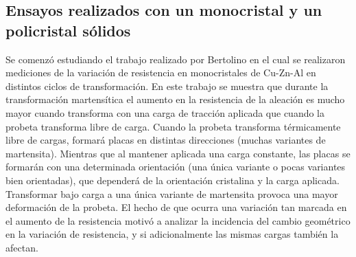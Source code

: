 \documentclass[a4paper,12pt,fleqn,twoside,openany]{book}
\begin{document}

\subsection{Ensayos realizados con un monocristal y un policristal sólidos} \label{PoilicMonocrist}




 
Se comenzó estudiando el trabajo realizado por Bertolino \cite{resistencia} en el cual se realizaron mediciones de la variación de resistencia en monocristales de Cu-Zn-Al en distintos ciclos de transformación. En este trabajo se muestra que durante la transformación martensítica el aumento en la resistencia de la aleación es mucho mayor  cuando transforma con una carga de tracción aplicada que cuando la probeta transforma libre de carga. Cuando la probeta transforma térmicamente libre de cargas, formará placas en distintas direcciones (muchas variantes de martensita). Mientras que al mantener aplicada una carga constante, las placas se formarán con una determinada orientación (una única variante o pocas variantes bien orientadas), que dependerá de la orientación cristalina y la carga aplicada. Transformar bajo carga a una única variante de martensita provoca una mayor deformación de la probeta. El hecho de que ocurra una variación tan marcada en el aumento de la resistencia motivó a analizar la incidencia del cambio geométrico en la variación de resistencia, y si adicionalmente las mismas cargas también la afectan. 
\end{document}
